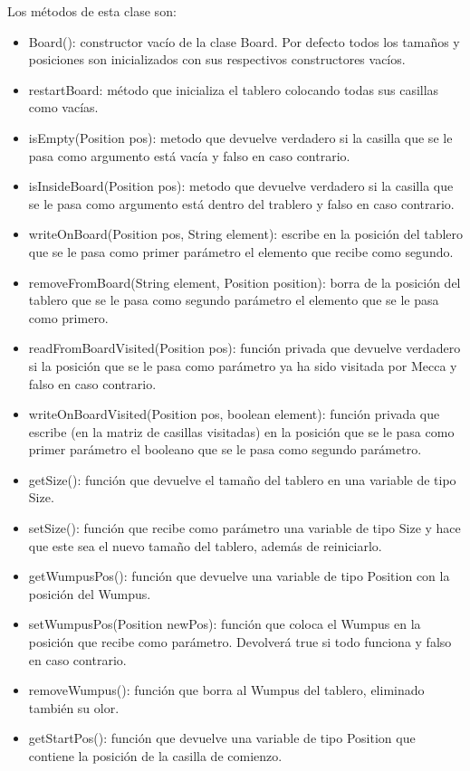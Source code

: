 \documentclass[a4paper,12pt,twoside,openright]{report}
\begin{document}
  Los métodos de esta clase son:
  \begin{itemize}
   \item Board(): constructor vacío de la clase Board. Por defecto todos los tamaños y posiciones son inicializados con sus 
   respectivos constructores vacíos.
   \item restartBoard: método que inicializa el tablero colocando todas sus casillas como vacías. 
   \item isEmpty(Position pos): metodo que devuelve verdadero si la casilla que se le pasa como argumento está vacía y falso en 
   caso contrario.
   \item isInsideBoard(Position pos): metodo que devuelve verdadero si la casilla que se le pasa como argumento está dentro 
   del trablero y falso en caso contrario.
   \item writeOnBoard(Position pos, String element): escribe en la posición del tablero que se le pasa como primer parámetro el 
   elemento que recibe como segundo.
   \item removeFromBoard(String element, Position position): borra de la posición del tablero que se le pasa como segundo parámetro 
   el elemento que se le pasa como primero.
   \item readFromBoardVisited(Position pos): función privada que devuelve verdadero si la posición que se le pasa como parámetro 
   ya ha sido visitada por Mecca y falso en caso contrario.
   \item writeOnBoardVisited(Position pos, boolean element): función privada que escribe (en la matriz de casillas visitadas) en la posición 
   que se le pasa como primer parámetro el booleano que se le pasa como segundo parámetro.
   \item getSize(): función que devuelve el tamaño del tablero en una variable de tipo Size.
   \item setSize(): función que recibe como parámetro una variable de tipo Size y hace que este sea el nuevo tamaño 
   del tablero, además de reiniciarlo.
   \item getWumpusPos(): función que devuelve una variable de tipo Position con la posición del Wumpus.
   \item setWumpusPos(Position newPos): función que coloca el Wumpus en la posición que recibe como parámetro. 
   Devolverá true si todo funciona y falso en caso contrario.
   \item removeWumpus(): función que borra al Wumpus del tablero, eliminado también su olor.
   \item getStartPos(): función que devuelve una variable de tipo Position que contiene la posición de la casilla de comienzo.

\end{itemize}
\end{document}

